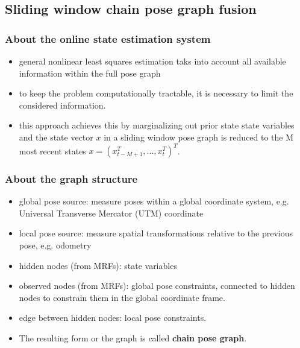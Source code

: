 \documentclass[letterpaper,11pt]{article}
\begin{document}
\subsection{Sliding window chain pose graph fusion}

\subsubsection{About the online state estimation system}

\begin{itemize}
	\item general nonlinear least squares estimation taks into account all available information within the full pose graph
	\item to keep the problem computationally tractable, it is necessary to limit the considered information.
	\item this approach achieves this by marginalizing out prior state state variables and the state vector $x$ in a sliding window pose graph is reduced to the M most recent states $x=(x_{t-M+1}^T,...,x_t^T)^T$.
\end{itemize}

\subsubsection{About the graph structure}

\begin{itemize}
	\item global pose source: measure poses within a global coordinate system, e.g. Universal Transverse Mercator (UTM) coordinate
	\item local pose source:  measure spatial transformations relative to the previous pose, e.g. odometry
	\item hidden nodes (from MRFs): state variables
	\item observed nodes (from MRFs): global pose constraints, connected to hidden nodes to constrain them in the global coordinate frame.
	\item edge between hidden nodes: local pose constraints.
	\item The resulting form or the graph is called \textbf{chain pose graph}.
\end{itemize}
\end{document}
